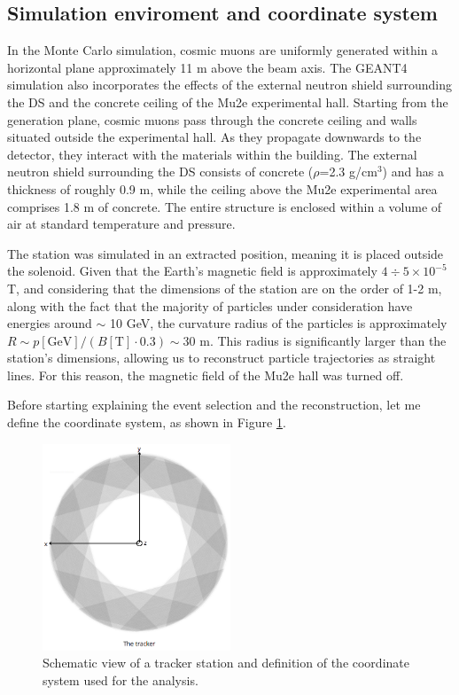 \subsection{Simulation enviroment and coordinate system}\label{genplane}
In the Monte Carlo simulation, cosmic muons are uniformly generated within a horizontal plane approximately 11 m 
above the beam axis. The GEANT4 simulation also incorporates the effects of the external neutron shield surrounding the DS 
and the concrete ceiling of the Mu2e experimental hall. Starting from the generation plane, 
cosmic muons pass through the concrete ceiling and walls situated outside the experimental hall. 
As they propagate downwards to the detector, they interact with the materials within the building. 
The external neutron shield surrounding the DS consists of concrete ($\rho$=2.3 g/cm$^3$) and has a thickness of 
roughly 0.9 m, while the ceiling above the Mu2e experimental area comprises 1.8 m of concrete. 
The entire structure is enclosed within a volume of air at standard temperature and pressure.

The station was simulated in an extracted position, meaning it is placed outside the solenoid. 
Given that the Earth's magnetic field is approximately $4 \div 5 \times 10^{-5}$ T, 
and considering that the dimensions of the station are on the order of 1-2 m, 
along with the fact that the majority of particles under consideration have energies around $\sim$ 10 GeV, 
the curvature radius of the particles is approximately $R\sim p[\text{GeV}]/(B[\text{T}]\cdot 0.3) \sim 30$ m. 
This radius is significantly larger than the station's dimensions, allowing us to reconstruct particle trajectories as straight lines.
For this reason, the magnetic field of the Mu2e hall was turned off. 

Before starting explaining the event selection and the reconstruction, let me define the coordinate system, as shown in Figure \ref{fig:coordinate}.
\begin{figure}[!h]
    \centering
    \includegraphics[width =0.5\textwidth]{figures/png/Screenshot_20240526_164527.png}
    \caption[Schematic view of a tracker station and the coordinate system.]{Schematic view of a tracker station and definition of the coordinate system used for the analysis.}
    \label{fig:coordinate}
\end{figure}
